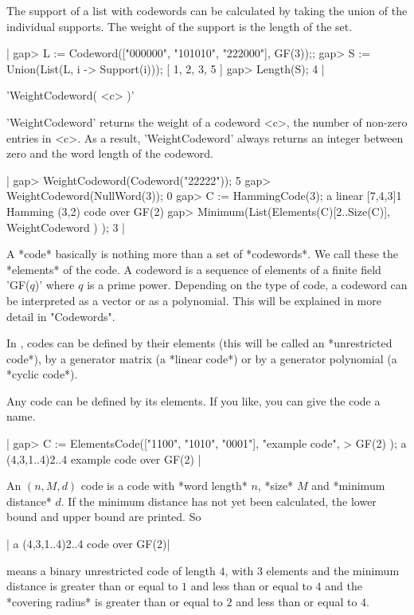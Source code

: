 The support  of  a list with  codewords  can be calculated by  taking the
union of the individual supports. The weight of the support is the length
of the set.

|    gap> L := Codeword(["000000", "101010", "222000"], GF(3));;
    gap> S := Union(List(L, i -> Support(i)));
    [ 1, 2, 3, 5 ]
    gap> Length(S);
    4 |


'WeightCodeword( <c> )'

'WeightCodeword'  returns the weight  of  a codeword <c>,  the number  of
non-zero entries in <c>. As a result,  'WeightCodeword' always returns an
integer between zero and the word length of the codeword.

|    gap> WeightCodeword(Codeword("22222"));
    5
    gap> WeightCodeword(NullWord(3));
    0
    gap> C := HammingCode(3);
    a linear [7,4,3]1 Hamming (3,2) code over GF(2)
    gap> Minimum(List(Elements(C){[2..Size(C)]}, WeightCodeword ) );
    3 |


A *code* basically is nothing  more than a   set of *codewords*. We  call
these the *elements* of the code. A codeword is a sequence of elements of
a finite field  'GF($q$)' where $q$ is  a  prime power. Depending  on the
type of code,  a   codeword can be interpreted  as   a  vector or  as   a
polynomial. This will be explained in more detail in "Codewords".

In {\GUAVA}, codes can be defined by their  elements (this will be called
an *unrestricted code*), by a generator matrix  (a *linear code*) or by a
generator polynomial (a *cyclic code*).

Any code can  be defined by  its elements. If  you like, you can give the
code a name.

|    gap> C := ElementsCode(["1100", "1010", "0001"], "example code",
    >                      GF(2) );
    a (4,3,1..4)2..4 example code over GF(2) |

An $(n,M,d)$ code   is a code  with   *word length* $n$,  *size*  $M$ and
*minimum   distance* $d$.  If  the   minimum distance  has not  yet  been
calculated, the lower bound and upper bound are printed. So

|    a (4,3,1..4)2..4 code over GF(2)|

means a binary unrestricted code of length $4$, with $3$ elements and the
minimum distance is greater than or equal to  $1$  and less than or equal
to $4$ and the *covering radius* is greater than or equal to $2$ and less
than or equal to $4$.


